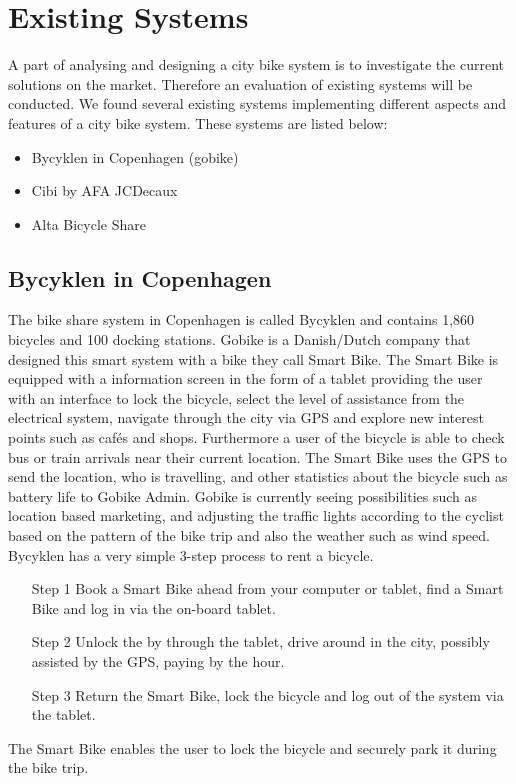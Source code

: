 \section{Existing Systems}
A part of analysing and designing a city bike system is to investigate the current solutions on the market. 
Therefore an evaluation of existing systems will be conducted.
We found several existing systems implementing different aspects and features of a city bike system. 
These systems are listed below:
\begin{itemize}
\item Bycyklen in Copenhagen (gobike)
\item Cibi by AFA JCDecaux
\item Alta Bicycle Share
\end{itemize}
\subsection{Bycyklen in Copenhagen}
The bike share system in Copenhagen is called Bycyklen and contains 1,860 bicycles and 100 docking stations\citep{misc:Bycyklen}. 
Gobike is a Danish/Dutch company that designed this smart system with a bike they call Smart Bike. 
The Smart Bike is equipped with a information screen in the form of a tablet providing the user with an interface to lock the bicycle, select the level of assistance from the electrical system, navigate through the city via GPS and explore new interest points such as cafés and shops.
Furthermore a user of the bicycle is able to check bus or train arrivals near their current location.
The Smart Bike uses the GPS to send the location, who is travelling, and other statistics about the bicycle such as battery life to Gobike Admin.
Gobike is currently seeing possibilities such as location based marketing, and adjusting the traffic lights according to the cyclist based on the pattern of the bike trip and also the weather such as wind speed.
Bycyklen has a very simple 3-step process to rent a bicycle.
\begin{itemize}
\item[Step 1] Book a Smart Bike ahead from your computer or tablet, find a Smart Bike and log in via the on-board tablet.
\item[Step 2] Unlock the by through the tablet, drive around in the city, possibly assisted by the GPS, paying by the hour.
\item[Step 3] Return the Smart Bike, lock the bicycle and log out of the system via the tablet.
\end{itemize}
The Smart Bike enables the user to lock the bicycle and securely park it during the bike trip.

